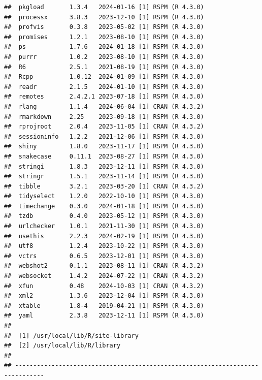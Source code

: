 \documentclass[
]{book}
\begin{document}
\begin{verbatim}
##  pkgload       1.3.4   2024-01-16 [1] RSPM (R 4.3.0)
##  processx      3.8.3   2023-12-10 [1] RSPM (R 4.3.0)
##  profvis       0.3.8   2023-05-02 [1] RSPM (R 4.3.0)
##  promises      1.2.1   2023-08-10 [1] RSPM (R 4.3.0)
##  ps            1.7.6   2024-01-18 [1] RSPM (R 4.3.0)
##  purrr         1.0.2   2023-08-10 [1] RSPM (R 4.3.0)
##  R6            2.5.1   2021-08-19 [1] RSPM (R 4.3.0)
##  Rcpp          1.0.12  2024-01-09 [1] RSPM (R 4.3.0)
##  readr         2.1.5   2024-01-10 [1] RSPM (R 4.3.0)
##  remotes       2.4.2.1 2023-07-18 [1] RSPM (R 4.3.0)
##  rlang         1.1.4   2024-06-04 [1] CRAN (R 4.3.2)
##  rmarkdown     2.25    2023-09-18 [1] RSPM (R 4.3.0)
##  rprojroot     2.0.4   2023-11-05 [1] CRAN (R 4.3.2)
##  sessioninfo   1.2.2   2021-12-06 [1] RSPM (R 4.3.0)
##  shiny         1.8.0   2023-11-17 [1] RSPM (R 4.3.0)
##  snakecase     0.11.1  2023-08-27 [1] RSPM (R 4.3.0)
##  stringi       1.8.3   2023-12-11 [1] RSPM (R 4.3.0)
##  stringr       1.5.1   2023-11-14 [1] RSPM (R 4.3.0)
##  tibble        3.2.1   2023-03-20 [1] CRAN (R 4.3.2)
##  tidyselect    1.2.0   2022-10-10 [1] RSPM (R 4.3.0)
##  timechange    0.3.0   2024-01-18 [1] RSPM (R 4.3.0)
##  tzdb          0.4.0   2023-05-12 [1] RSPM (R 4.3.0)
##  urlchecker    1.0.1   2021-11-30 [1] RSPM (R 4.3.0)
##  usethis       2.2.3   2024-02-19 [1] RSPM (R 4.3.0)
##  utf8          1.2.4   2023-10-22 [1] RSPM (R 4.3.0)
##  vctrs         0.6.5   2023-12-01 [1] RSPM (R 4.3.0)
##  webshot2      0.1.1   2023-08-11 [1] CRAN (R 4.3.2)
##  websocket     1.4.2   2024-07-22 [1] CRAN (R 4.3.2)
##  xfun          0.48    2024-10-03 [1] CRAN (R 4.3.2)
##  xml2          1.3.6   2023-12-04 [1] RSPM (R 4.3.0)
##  xtable        1.8-4   2019-04-21 [1] RSPM (R 4.3.0)
##  yaml          2.3.8   2023-12-11 [1] RSPM (R 4.3.0)
## 
##  [1] /usr/local/lib/R/site-library
##  [2] /usr/local/lib/R/library
## 
## ------------------------------------------------------------------------------
\end{verbatim}
\end{document}
